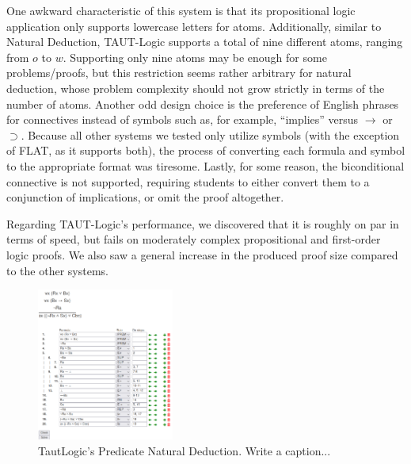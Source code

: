 \documentclass[ms]{uncgdissertationexp2}
\theoremstyle{plain}
\theoremstyle{definition}
\theoremstyle{remark}
\newcommand{\titlecaption}[2]{\caption[#1]{#1. #2}}
\begin{document}
One awkward characteristic of this system is that its propositional logic application only supports lowercase letters for atoms. Additionally, similar to Natural Deduction, TAUT-Logic supports a total of nine different atoms, ranging from $o$ to $w$. Supporting only nine atoms may be enough for some problems/proofs, but this restriction seems rather arbitrary for natural deduction, whose problem complexity should not grow strictly in terms of the number of atoms. Another odd design choice is the preference of English phrases for connectives instead of symbols such as, for example, ``implies'' versus $\to$ or $\supset$. Because all other systems we tested only utilize symbols (with the exception of FLAT, as it supports both), the process of converting each formula and symbol to the appropriate format was tiresome. Lastly, for some reason, the biconditional connective is not supported, requiring students to either convert them to a conjunction of implications, or omit the proof altogether. 
    
Regarding TAUT-Logic's performance, we discovered that it is roughly on par in terms of speed, but fails on moderately complex propositional and first-order logic proofs. We also saw a general increase in the produced proof size compared to the other systems. 
\begin{figure}[!ht]
	\centering
	\includegraphics[width=0.4\textwidth]{tautlogic.png}
	\titlecaption{TautLogic's Predicate Natural Deduction}{Write a caption...}
	\label{fig:tautlogic}
\end{figure} 
\end{document}
